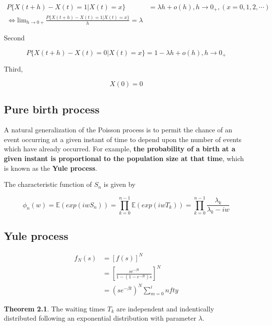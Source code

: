 \documentclass[12pt]{article}
\theoremstyle{nonumberbreak}
\begin{document}
$$
\begin{aligned}
P\{ X(t+h) - X(t) = 1 | X(t) = x \} &= \lambda h + o(h), h \to 0_+, (x=0,1,2,\cdots) \\[10pt]
\Leftrightarrow \mathrm{lim}_{h \to 0+} \frac{P\{ X(t+h) - X(t) = 1 | X(t) = x \}}{h} = \lambda
\end{aligned}
$$



Second


$$
P\{ X(t+h) - X(t) = 0 | X(t) = x \} = 1 - \lambda h + o(h), h \to 0_+
$$


Third,

$$
X(0) = 0 
$$


\subsection{Pure birth process}

A natural generalization of the Poisson process is to permit the chance of
an event occurring at a given instant of time to depend upon the number of events which have already occurred. For example, \textbf{the probability of a birth at a given instant is proportional to the population size at that time}, which is known as the \textbf{Yule process}.




The characteristic function of $S_n$ is given by

$$
\phi_n(w) = \mathbb{E}(exp(iwS_n)) = \prod_{k=0}^{n-1} \mathbb{E}(exp(iw T_k)) = \prod_{k=0}^{n-1} \frac{\lambda_k}{\lambda_k - iw}
$$


\subsection{Yule process}



$$
\begin{aligned}
f_N(s) &= [f(s)]^N \\[8pt]
&= \left[ \frac{se^{-\beta t}}{1 - (1-e^{-\beta t})s} \right]^N \\[8pt]
&= (s e^{-\beta t})^N \sum_{m=0}^infty 
\end{aligned}
$$




\begin{theorem}
\textbf{Theorem 2.1}. The waiting times $T_k$ are independent and indentically distributed following an exponential distribution with parameter $\lambda$. 
\end{theorem}
\end{document}
